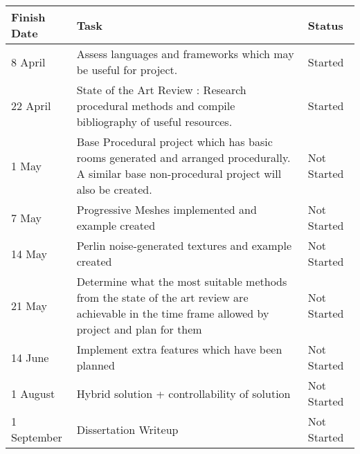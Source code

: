 \documentclass[12pt]{article}
\begin{document}
\begin{tabular}{|l|p{8cm}|l|}
  \hline
	Finish Date & Task & Status \\
	\hline
	8 April & Assess languages and frameworks which may be useful for project. & Started \\
	22 April & State of the Art Review : Research procedural methods and compile bibliography of useful resources. & Started \\
	1 May & Base Procedural project which has basic rooms generated and arranged procedurally.
			A similar base non-procedural project will also be created. & Not Started \\
	7 May & Progressive Meshes implemented and example created & Not Started \\
	14 May & Perlin noise-generated textures and example created & Not Started \\
	21 May & Determine what the most suitable methods from the state of the art review are achievable in the time frame allowed by project and plan for them & Not Started \\
	14 June & Implement extra features which have been planned & Not Started \\
	1 August & Hybrid solution + controllability of solution & Not Started \\
	1 September & Dissertation Writeup & Not Started \\
  \hline
\end{tabular}

%


\end{document}
